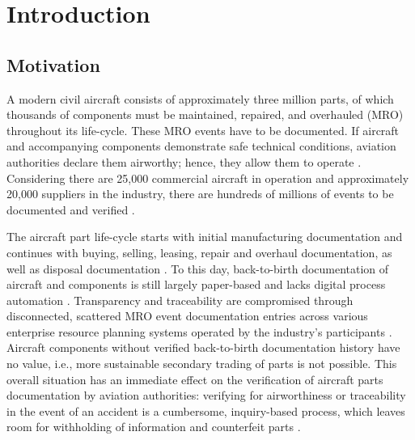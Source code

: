 \chapter{Introduction}
\section{Motivation}
A modern civil aircraft consists of approximately three million parts, of which thousands of components must be maintained, repaired, and overhauled (MRO) throughout its life-cycle. These MRO events have to be documented. If aircraft and accompanying components demonstrate safe technical conditions, aviation authorities declare them airworthy; hence, they allow them to operate \citep{FornaconFrank}. Considering there are 25,000 commercial aircraft in operation and approximately 20,000 suppliers in the industry, there are hundreds of millions of events to be documented and verified \citep{mroBCservices1}.

The aircraft part life-cycle starts with initial manufacturing documentation and continues with buying, selling, leasing, repair and overhaul documentation, as well as disposal documentation \citep{FornaconFrank, mroBCservices}. To this day, back-to-birth documentation of aircraft and components is still largely paper-based and lacks digital process automation \citep{efthymiou}. Transparency and traceability are compromised through disconnected, scattered MRO event documentation entries across various enterprise resource planning systems operated by the industry's participants \citep{FornaconFrank, mroBCservices1}. Aircraft components without verified back-to-birth documentation history have no value, i.e., more sustainable secondary trading of parts is not possible. This overall situation has an immediate effect on the verification of aircraft parts documentation by aviation authorities: verifying for airworthiness or traceability in the event of an accident is a cumbersome, inquiry-based process, which leaves room for withholding of information and counterfeit parts \citep{planecrash, efthymiou}.

